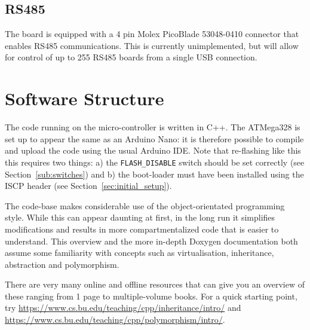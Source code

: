 \documentclass[11pt]{report}
\begin{document}



\section{RS485} %
\label{sec:rs485}

The board is equipped with a 4 pin Molex PicoBlade 53048-0410 connector that enables RS485 communications. This is currently unimplemented, but will allow for control of up to 255 RS485 boards from a single USB connection. 



\chapter{Software Structure} %
\label{sec:software_structure}

The code running on the micro-controller is written in C++. The ATMega328 is set up to appear the same as an Arduino Nano: it is therefore possible to compile and upload the code using the usual Arduino IDE. Note that re-flashing like this this requires two things: a) the {\tt FLASH\_DISABLE} switch should be set correctly (see Section~\ref{sub:switches}) and b) the boot-loader must have been installed using the ISCP header (see Section~\ref{sec:initial_setup}). 

The code-base makes considerable use of the object-orientated programming style. While this can appear daunting at first, in the long run it simplifies modifications and results in more compartmentalized code that is easier to understand. This overview and the more in-depth Doxygen documentation both assume some familiarity with concepts such as virtualisation, inheritance, abstraction and polymorphism.

There are very many online and offline resources that can give you an overview of these ranging from 1 page to multiple-volume books. For a quick starting point, try \url{https://www.cs.bu.edu/teaching/cpp/inheritance/intro/} and \url{https://www.cs.bu.edu/teaching/cpp/polymorphism/intro/}. 
\end{document}
